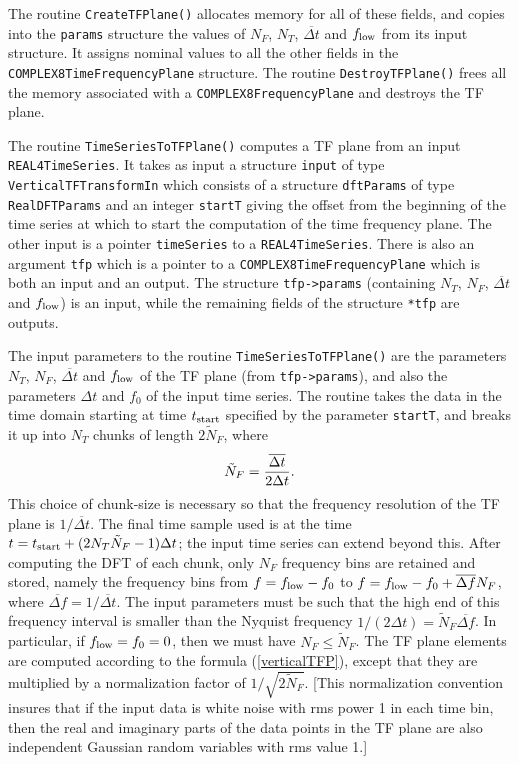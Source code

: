 \documentclass{article}
\begin{document}
The routine \verb+CreateTFPlane()+ allocates memory for all of these
fields, and copies into the \verb+params+ structure the values of
$N_F$, $N_T$, ${\overline {\Delta t}}$ and $f_{\rm low}$ from its 
input structure.  It assigns nominal values to all the other fields in
the \verb+COMPLEX8TimeFrequencyPlane+ structure.  The routine
\verb+DestroyTFPlane()+ frees all the memory associated with a
\verb+COMPLEX8FrequencyPlane+ and destroys the TF plane.


The routine \verb+TimeSeriesToTFPlane()+ computes a TF plane from an input 
\verb+REAL4TimeSeries+.  It takes as input a structure \verb+input+ of type
\verb+VerticalTFTransformIn+ which consists of a structure \verb+dftParams+ of
type \verb+RealDFTParams+ and an integer \verb+startT+ giving the 
offset from the beginning of the time series at which to start the
computation of the time frequency plane.  The other input is a pointer
\verb+timeSeries+ to a \verb+REAL4TimeSeries+.  There is also an
argument \verb+tfp+ which is a pointer to a
\verb+COMPLEX8TimeFrequencyPlane+ which is both an input and an
output.  The structure \verb+tfp->params+ (containing $N_T$, $N_F$,
${\overline {\Delta t}}$ and $f_{\rm low}$) is an input, while the
remaining fields of the structure \verb+*tfp+ are outputs.

The input parameters to the routine \verb+TimeSeriesToTFPlane()+ are the
parameters $N_T$, $N_F$, ${\overline {\Delta t}}$ and $f_{\rm low}$ of
the TF plane (from \verb+tfp->params+), and also the parameters
$\Delta t$ and $f_0$ of the input time series.  The routine takes the
data in the time domain starting at time $t_{\rm start}$
specified by the parameter \verb+startT+, and breaks
it up into $N_T$ chunks of length $2 {\tilde N}_F$, where
\begin{equation}
{\tilde N}_F = { {\overline {\Delta t}} \over 2 \Delta t}.
\end{equation}
This choice of chunk-size is necessary so that the frequency resolution of
the TF plane is $1/{\overline {\Delta t}}$.  
The final time sample used is at the time $t = t_{\rm start} + (2 N_T
{\tilde N}_F-1) \Delta t$; the input time series can extend beyond this.
After computing the DFT of each chunk, only $N_F$ frequency bins are
retained and stored, namely the frequency bins from
$f = f_{\rm low} - f_0$ to $f = f_{\rm low} - f_0 + {\overline {\Delta
f}} N_F$, where ${\overline {\Delta f}} = 1 / {\overline {\Delta t}}$.
The input parameters must be such that the high end of this  
frequency interval is smaller than the Nyquist frequency $1 / (2
\Delta t) = {\tilde N}_F {\overline {\Delta f}}$.  In particular, if
$f_{\rm low} = f_0 =0$, then we must have $N_F \le {\tilde N}_F$.
The TF plane elements are computed according to the formula
(\ref{verticalTFP}), except that they are multiplied by a
normalization factor of $1/\sqrt{2 {\tilde N}_F}$.  
[This
normalization convention
insures that if the input data is white noise with rms power 1 in each
time bin, then the real and imaginary parts of the data points in the
TF plane are also independent Gaussian random variables with rms value
1.]  
\end{document}
